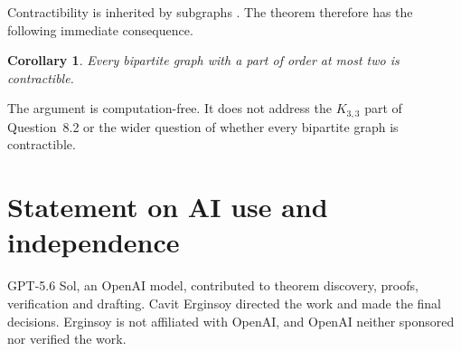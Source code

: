 \documentclass[11pt]{amsart}
\newtheorem{corollary}[theorem]{Corollary}
\begin{document}
Contractibility is inherited by subgraphs
\cite[Lemma~2.2]{KundgenPelsmajerRamamurthi2015}.  The theorem therefore
has the following immediate consequence.

\begin{corollary}
Every bipartite graph with a part of order at most two is contractible.
\end{corollary}

The argument is computation-free.  It does not address the $K_{3,3}$
part of Question~8.2 or the wider question of whether every bipartite
graph is contractible.

\section*{Statement on AI use and independence}

GPT-5.6 Sol, an OpenAI model, contributed to theorem discovery, proofs,
verification and drafting.  Cavit Erginsoy directed the work and made the
final decisions.  Erginsoy is not affiliated with OpenAI, and OpenAI
neither sponsored nor verified the work.

{


}
\end{document}
